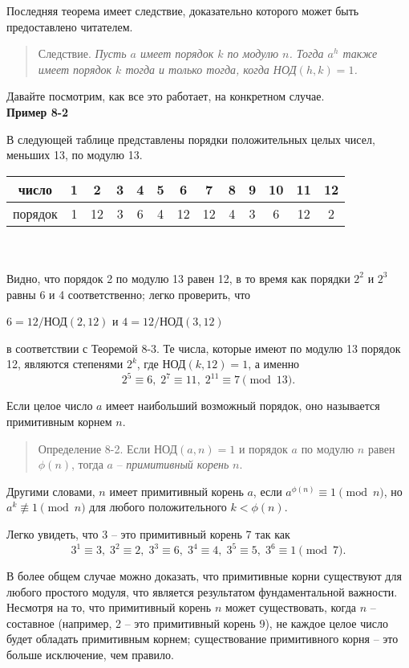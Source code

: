 \documentclass[11pt]{article}
\begin{document}
Последняя теорема имеет следствие, доказательно которого может быть предоставлено читателем.

\begin{quote}
	\large{Следствие}. \it Пусть $a$ имеет порядок $k$ по модулю $n$. Тогда $a^h$ также имеет порядок $k$ тогда и только тогда, когда НОД$(h,k)=1$.
\end{quote}

Давайте посмотрим, как все это работает, на конкретном случае.\\

\textbf{Пример 8-2}

В следующей таблице представлены порядки положительных целых чисел, меньших 13, по модулю 13.\\

\begin{tabular}{c|c c c c c c c c c c c c}
    число &1 &2 &3 &4 &5 &6 &7 &8 &9 &10 &11 &12\\
    \hline
    порядок &1 &12 &3 &6 &4 &12 &12 &4 &3 &6 &12 &2
\end{tabular}\\\\

Видно, что порядок 2 по модулю 13 равен 12, в то время как порядки $2^2$ и $2^3$ равны 6 и 4 соответственно; легко проверить, что
\begin{center}
    $6=12/$НОД$(2,12)$ и $4=12/$НОД$(3,12)$
\end{center}
в соответствии с Теоремой 8-3. Те числа, которые имеют по модулю 13 порядок 12, являются степенями $2^k$, где НОД$(k,12)=1$, а именно $$2^5\equiv6,\;2^7\equiv11,\;2^{11}\equiv7\pmod{13}.$$

Если целое число $a$ имеет наибольший возможный порядок, оно называется примитивным корнем $n$.

\begin{quote}
	\large{Определение 8-2}. Если НОД$(a,n)=1$ и порядок $a$ по модулю $n$ равен $\phi(n)$, тогда $a$ -- \emph{примитивный корень} $n.$
\end{quote}

Другими словами, $n$ имеет примитивный корень $a$, если $a^{\phi(n)}\equiv1\pmod{n}$, но $a^k\not\equiv1\pmod{n}$ для любого положительного $k<\phi(n)$.

Легко увидеть, что 3 -- это примитивный корень 7 так как $$3^1\equiv3,\; 3^2\equiv2,\; 3^3\equiv6,\; 3^4\equiv4,\; 3^5\equiv5,\; 3^6\equiv1\pmod{7}.$$

В более общем случае можно доказать, что примитивные корни существуют для любого простого модуля, что является результатом фундаментальной важности. Несмотря на то, что примитивный корень $n$ может существовать, когда $n$ -- составное (например, 2 -- это примитивный корень 9), не каждое целое число будет обладать примитивным корнем; существование примитивного корня -- это больше исключение, чем правило.\\
\end{document}
